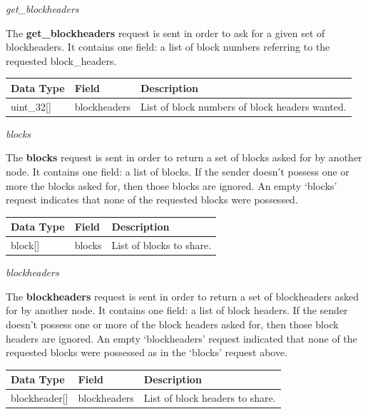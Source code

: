 \documentclass{article}
\begin{document}
\begin{center}
    \Large \textit{get\_blockheaders}
\end{center}
The \textbf{get\_blockheaders} request is sent in order to ask for a given set of blockheaders. It contains one field: a list of block numbers referring to the requested block\_headers.
\begin{table}[H]
\centering
\begin{tabular}{|p{2.2cm}|p{3cm}|p{5.5cm}|}
\hline
\rowcolor{tblgrey}
Data Type   & Field       & Description\\ \hline
uint\_32[\hspace{0.05cm}] & blockheaders & List of block numbers of block headers wanted.                    \\ \hline
\end{tabular}
\end{table}

\begin{center}
    \Large \textit{blocks}
\end{center}
The \textbf{blocks} request is sent in order to return a set of blocks asked for by another node. It contains one field: a list of blocks. If the sender doesn't possess one or more the blocks asked for, then those blocks are ignored. An empty `blocks' request indicates that none of the requested blocks were possessed.
\begin{table}[H]
\centering
\begin{tabular}{|p{2.2cm}|p{3cm}|p{5.5cm}|}
\hline
\rowcolor{tblgrey}
Data Type   & Field       & Description\\ \hline
block[\hspace{0.05cm}] & blocks & List of blocks to share.                    \\ \hline
\end{tabular}
\end{table}

\begin{center}
    \Large \textit{blockheaders}
\end{center}
The \textbf{blockheaders} request is sent in order to return a set of blockheaders asked for by another node. It contains one field: a list of block headers. If the sender doesn't possess one or more of the block headers asked for, then those block headers are ignored. An empty `blockheaders' request indicated that none of the requested blocks were possessed as in the `blocks' request above.
\begin{table}[H]
\centering
\begin{tabular}{|p{2.2cm}|p{3cm}|p{5.5cm}|}
\hline
\rowcolor{tblgrey}
Data Type   & Field       & Description\\ \hline
blockheader[\hspace{0.05cm}] & blockheaders & List of block headers to share.                    \\ \hline
\end{tabular}
\end{table}
\end{document}
